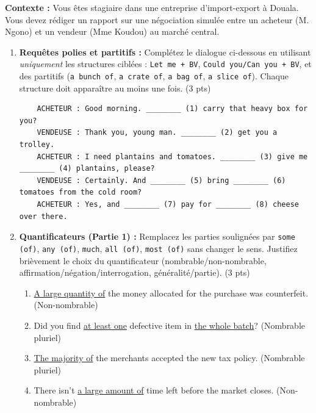\documentclass[11pt]{article}
\begin{document}
\begin{exercice}
\textbf{Contexte :} Vous êtes stagiaire dans une entreprise d'import-export à Douala. Vous devez rédiger un rapport sur une négociation simulée entre un acheteur (M. Ngono) et un vendeur (Mme Koudou) au marché central.

\begin{enumerate}
    \item \textbf{Requêtes polies et partitifs :} Complétez le dialogue ci-dessous en utilisant \textit{uniquement} les structures ciblées : \texttt{Let me + BV}, \texttt{Could you/Can you + BV}, et des partitifs (\texttt{a bunch of}, \texttt{a crate of}, \texttt{a bag of}, \texttt{a slice of}). Chaque structure doit apparaître au moins une fois. (3 pts)
    
    \begin{verbatim}
    ACHETEUR : Good morning. ________ (1) carry that heavy box for you?
    VENDEUSE : Thank you, young man. ________ (2) get you a trolley.
    ACHETEUR : I need plantains and tomatoes. ________ (3) give me ________ (4) plantains, please? 
    VENDEUSE : Certainly. And ________ (5) bring ________ (6) tomatoes from the cold room?
    ACHETEUR : Yes, and ________ (7) pay for ________ (8) cheese over there.
    \end{verbatim}

    \item \textbf{Quantificateurs (Partie 1) :} Remplacez les parties soulignées par \texttt{some (of)}, \texttt{any (of)}, \texttt{much}, \texttt{all (of)}, \texttt{most (of)} sans changer le sens. Justifiez brièvement le choix du quantificateur (nombrable/non-nombrable, affirmation/négation/interrogation, généralité/partie). (3 pts)
    \begin{enumerate}
        \item \underline{A large quantity of} the money allocated for the purchase was counterfeit. (Non-nombrable)
        \item Did you find \underline{at least one} defective item in \underline{the whole batch}? (Nombrable pluriel)
        \item \underline{The majority of} the merchants accepted the new tax policy. (Nombrable pluriel)
        \item There isn't \underline{a large amount of} time left before the market closes. (Non-nombrable)
    \end{enumerate}
\end{enumerate}
\end{exercice}
\end{document}
